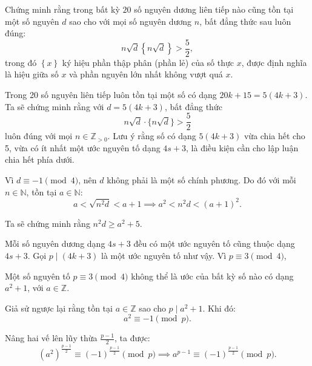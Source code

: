 \ifshowproblemandsoln
\ifshowproblem\begin{problem}\label{problem:BMO-2015-P4}\fi
\ifshowsoln\begin{problem}\fi
    Chứng minh rằng trong bất kỳ \( 20 \) số nguyên dương liên tiếp nào cũng tồn tại một số nguyên \( d \)
    sao cho với mọi số nguyên dương \( n \), bất đẳng thức sau luôn đúng:
    \[
        n \sqrt{d} \left\{ n \sqrt{d} \right\} > \frac{5}{2},
    \]
    trong đó \( \left\{ x \right\} \) ký hiệu phần thập phân (phần lẻ) của số thực \( x \),
    được định nghĩa là hiệu giữa số \( x \) và phần nguyên lớn nhất không vượt quá \( x \).    
\end{problem}
\fi

\ifshowsoln
\begin{soln}\footnotemark
    Trong 20 số nguyên liên tiếp luôn tồn tại một số có dạng \( 20k + 15 = 5(4k + 3) \). Ta sẽ chứng minh rằng với \( d = 5(4k + 3) \), bất đẳng thức
    \[
        n \sqrt{d} \cdot \{n \sqrt{d}\} > \frac{5}{2}
    \]
    luôn đúng với mọi \( n \in \mathbb{Z}_{>0} \). Lưu ý rằng số có dạng \( 5(4k + 3) \) vừa chia hết cho 5,
    vừa có ít nhất một ước nguyên tố dạng \( 4s + 3 \), là điều kiện cần cho lập luận chia hết phía dưới.

    Vì \( d \equiv -1 \pmod{4} \), nên \( d \) không phải là một số chính phương. Do đó với mỗi \( n \in \mathbb{N} \), tồn tại \( a \in \mathbb{N} \):
    \[
        a < \sqrt{n^2 d} < a + 1 \implies a^2 < n^2 d < (a + 1)^2.
    \]

    Ta sẽ chứng minh rằng \( n^2 d \ge a^2 + 5 \).

    Mỗi số nguyên dương dạng \( 4s + 3 \) đều có một ước nguyên tố cũng thuộc dạng \( 4s + 3 \).
    Gọi \( p \mid (4k + 3) \) là một ước nguyên tố như vậy. Vì \( p \equiv 3 \pmod{4} \),

    \begin{lemma*}
        Một số nguyên tố \( p \equiv 3 \pmod{4} \) không thể là ước của bất kỳ số nào có dạng \( a^2 + 1 \), với \( a \in \mathbb{Z} \).
    \end{lemma*}
    
    \begin{subproof}
        Giả sử ngược lại rằng tồn tại \( a \in \mathbb{Z} \) sao cho \( p \mid a^2 + 1 \). Khi đó:
        \[
            a^2 \equiv -1 \pmod{p}.
        \]

        Nâng hai vế lên lũy thừa \( \frac{p - 1}{2} \), ta được:
        \[
            (a^2)^{\frac{p-1}{2}} \equiv (-1)^{\frac{p-1}{2}} \pmod{p} \implies a^{p-1} \equiv (-1)^{\frac{p-1}{2}} \pmod{p}.
        \]


\end{subproof}
\end{soln}
\end{problem}

